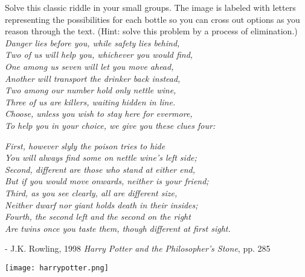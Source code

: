 \documentclass[12pt]{article}
\begin{document}
\pagebreak
Solve this classic riddle in your small groups. The image is labeled with letters representing the possibilities for each bottle so you can cross out options as you reason through the text. (Hint: solve this problem by a process of elimination.)  \\

\noindent \emph{Danger lies before you, while safety lies behind, \\
Two of us will help you, whichever you would find,\\
One among us seven will let you move ahead,\\
Another will transport the drinker back instead,\\
Two among our number hold only nettle wine,\\
Three of us are killers, waiting hidden in line.\\
Choose, unless you wish to stay here for evermore,\\
To help you in your choice, we give you these clues four:\\}

\noindent \emph{First, however slyly the poison tries to hide\\
You will always find some on nettle wine’s left side;\\
Second, different are those who stand at either end,\\
But if you would move onwards, neither is your friend;\\
Third, as you see clearly, all are different size,\\
Neither dwarf nor giant holds death in their insides;\\
Fourth, the second left and the second on the right\\
Are twins once you taste them, though different at first sight.\\}

- J.K. Rowling, 1998 \emph{Harry Potter and the Philosopher's Stone}, pp. 285
\vspace{0.25in}

\texttt{[image: harrypotter.png]}


\end{document}
